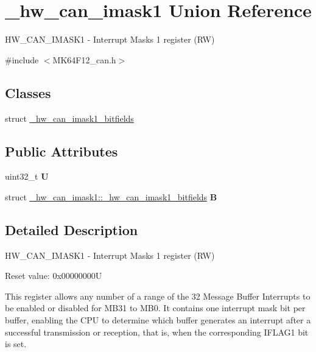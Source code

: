 \hypertarget{union__hw__can__imask1}{}\section{\+\_\+hw\+\_\+can\+\_\+imask1 Union Reference}
\label{union__hw__can__imask1}


H\+W\+\_\+\+C\+A\+N\+\_\+\+I\+M\+A\+S\+K1 -\/ Interrupt Masks 1 register (RW)  




{\ttfamily \#include $<$M\+K64\+F12\+\_\+can.\+h$>$}

\subsection*{Classes}
\begin{DoxyCompactItemize}
\item 
struct \hyperlink{struct__hw__can__imask1_1_1__hw__can__imask1__bitfields}{\+\_\+hw\+\_\+can\+\_\+imask1\+\_\+bitfields}
\end{DoxyCompactItemize}
\subsection*{Public Attributes}
\begin{DoxyCompactItemize}
\item 
uint32\+\_\+t {\bfseries U}\hypertarget{union__hw__can__imask1_a0277528eae7ce600b9a66805f74649ac}{}\label{union__hw__can__imask1_a0277528eae7ce600b9a66805f74649ac}

\item 
struct \hyperlink{struct__hw__can__imask1_1_1__hw__can__imask1__bitfields}{\+\_\+hw\+\_\+can\+\_\+imask1\+::\+\_\+hw\+\_\+can\+\_\+imask1\+\_\+bitfields} {\bfseries B}\hypertarget{union__hw__can__imask1_a595d707939ada3e1eba95bd946356896}{}\label{union__hw__can__imask1_a595d707939ada3e1eba95bd946356896}

\end{DoxyCompactItemize}


\subsection{Detailed Description}
H\+W\+\_\+\+C\+A\+N\+\_\+\+I\+M\+A\+S\+K1 -\/ Interrupt Masks 1 register (RW) 

Reset value\+: 0x00000000U

This register allows any number of a range of the 32 Message Buffer Interrupts to be enabled or disabled for M\+B31 to M\+B0. It contains one interrupt mask bit per buffer, enabling the C\+PU to determine which buffer generates an interrupt after a successful transmission or reception, that is, when the corresponding I\+F\+L\+A\+G1 bit is set. 

